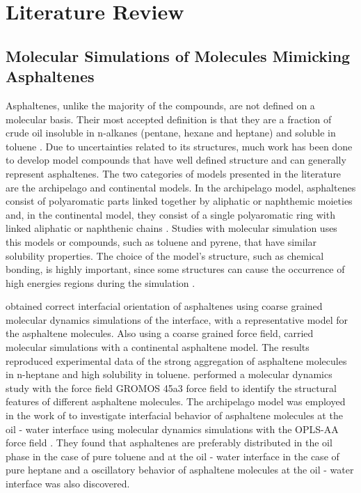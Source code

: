
\chapter{Literature Review} %
\label{Chapter2} %
\section{Molecular Simulations of Molecules Mimicking Asphaltenes}
Asphaltenes, unlike the majority of the compounds, are not defined on a molecular basis. Their most accepted definition is that they are a fraction of crude oil insoluble in n-alkanes (pentane, hexane and heptane) and soluble in toluene \cite{SJOBLOM2003399}. Due to uncertainties related to its structures, much work has been done to develop model compounds that have well defined structure and can generally represent asphaltenes. The two categories of models presented in the literature are the archipelago and continental models. In the archipelago model, asphaltenes consist of polyaromatic parts linked together by aliphatic or naphthemic moieties and, in the continental model, they consist of a single
polyaromatic ring with linked aliphatic or naphthenic chains \cite{doi:10.1021/ef900975e,doi:10.1080/0892702031000148762}. Studies with molecular simulation uses this models or compounds, such as toluene and pyrene, that have similar solubility properties. The choice of the model's structure, such as chemical bonding, is highly important, since some structures can cause the occurrence of high energies regions during the simulation \cite{doi:10.1021/ef200507c} .   

  obtained correct interfacial orientation of asphaltenes using coarse grained molecular dynamics simulations of the interface, with a representative model for the asphaltene molecules. Also using a coarse grained force field,  carried molecular simulations with a continental asphaltene model. The results reproduced experimental data of the strong aggregation
of asphaltene molecules in n-heptane and high solubility in toluene.  performed a molecular
dynamics study with the force field GROMOS 45a3 force field \cite{JCC:JCC1078} to identify the structural features of different asphaltene molecules. The archipelago model was employed in the work of  to investigate interfacial behavior of asphaltene molecules at the oil - water interface using molecular dynamics simulations with the OPLS-AA force field \cite{doi:10.1021/ja00214a001}. They found that  asphaltenes are preferably distributed in the oil phase in the case of pure toluene and at the oil - water interface
in the case of pure heptane and a
oscillatory behavior of asphaltene molecules at the oil - water interface was also discovered.

